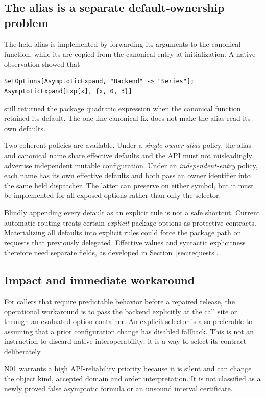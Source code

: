 \documentclass[11pt,a4paper]{article}
\newcommand{\code}[1]{\texttt{\detokenize{#1}}}
\begin{document}
\subsection{The alias is a separate default-ownership problem}
The held alias is implemented by forwarding its arguments to the canonical function, while its \code{Options} are copied from the canonical entry at initialization. A native observation showed that
\begin{lstlisting}
SetOptions[AsymptoticExpand, "Backend" -> "Series"];
AsymptoticExpand[Exp[x], {x, 0, 3}]
\end{lstlisting}
still returned the package quadratic expression when the canonical function retained its \code{Automatic} default. The one-line canonical fix does not make the alias read its own defaults.\cite{native-source}

Two coherent policies are available. Under a \emph{single-owner alias} policy, the alias and canonical name share effective defaults and the API must not misleadingly advertise independent mutable configuration. Under an \emph{independent-entry} policy, each name has its own effective defaults and both pass an owner identifier into the same held dispatcher. The latter can preserve \code{SetOptions} on either symbol, but it must be implemented for all exposed options rather than only the selector.

Blindly appending every default as an explicit rule is not a safe shortcut. Current automatic routing treats certain \emph{explicit} package options as protective contracts. Materializing all defaults into explicit rules could force the package path on requests that previously delegated. Effective values and syntactic explicitness therefore need separate fields, as developed in Section~\ref{sec:requests}.

\subsection{Impact and immediate workaround}
For callers that require predictable behavior before a repaired release, the operational workaround is to pass the backend explicitly at the call site or through an evaluated option container. An explicit \code{"Package"} selector is also preferable to assuming that a prior configuration change has disabled fallback. This is not an instruction to discard native interoperability; it is a way to select its contract deliberately.

N01 warrants a high API-reliability priority because it is silent and can change the object kind, accepted domain and order interpretation. It is not classified as a newly proved false asymptotic formula or an unsound interval certificate.
\end{document}
